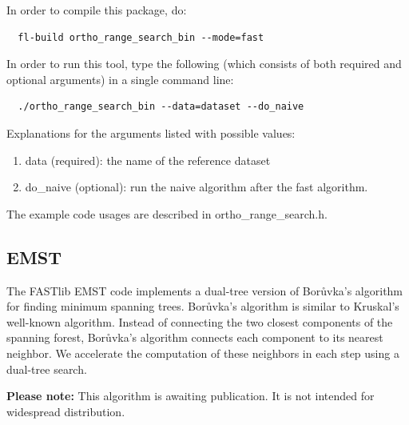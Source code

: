 \documentclass[letter]{report}
\begin{document}
In order to compile this package, do: 
\begin{verbatim}
  fl-build ortho_range_search_bin --mode=fast
\end{verbatim}
In order to run this tool, type the following (which consists of
both required and optional arguments) in a single command line:
\begin{verbatim}
  ./ortho_range_search_bin --data=dataset --do_naive
\end{verbatim}

Explanations for the arguments listed with possible values:

\begin{enumerate}
\item{data (required): the name of the reference dataset}
\item{do\_naive (optional): run the naive algorithm after the fast
algorithm.}
\end{enumerate}
The example code usages are described in ortho\_range\_search.h.

\subsection{EMST}
The FASTlib EMST code implements a dual-tree version of Bor\r{u}vka's algorithm for finding minimum spanning trees.  Bor\r{u}vka's algorithm is similar to Kruskal's well-known algorithm.  Instead of connecting the two closest components of the spanning forest, Bor\r{u}vka's algorithm connects each component to its nearest neighbor.  We accelerate the computation of these neighbors in each step using a dual-tree search.  

\textbf{Please note:}  This algorithm is awaiting publication.  It is not intended for widespread distribution.  
\end{document}
